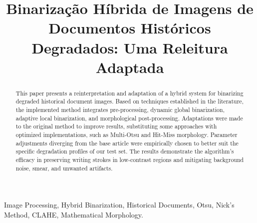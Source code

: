 \documentclass[conference]{IEEEtran}
\begin{document}
\title{Binarização Híbrida de Imagens de Documentos Históricos Degradados: Uma Releitura Adaptada\\
{\footnotesize }
}

\author{
}

\maketitle

\begin{abstract}
This paper presents a reinterpretation and adaptation of a hybrid system for binarizing degraded historical document images. Based on techniques established in the literature, the implemented method integrates pre-processing, dynamic global binarization, adaptive local binarization, and morphological post-processing. Adaptations were made to the original method to improve results, substituting some approaches with optimized implementations, such as Multi-Otsu and Hit-Miss morphology. Parameter adjustments diverging from the base article were empirically chosen to better suit the specific degradation profiles of our test set. The results demonstrate the algorithm's efficacy in preserving writing strokes in low-contrast regions and mitigating background noise, smear, and unwanted artifacts.
\end{abstract}

\begin{IEEEkeywords}
Image Processing, Hybrid Binarization, Historical Documents, Otsu, Nick's Method, CLAHE, Mathematical Morphology.
\end{IEEEkeywords}
\end{document}
